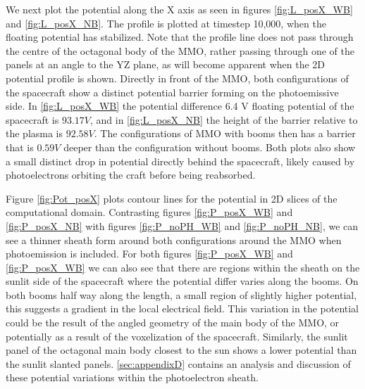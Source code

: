We next plot the potential along the X axis as seen in figures \ref{fig:L_posX_WB} and \ref{fig:L_posX_NB}. The profile is plotted at timestep 10,000, when the floating potential has stabilized. Note that the profile line does not pass through the centre of the octagonal body of the MMO, rather passing through one of the panels at an angle to the YZ plane, as will become apparent when the 2D potential profile is shown. Directly in front of the MMO, both configurations of the spacecraft show a distinct potential barrier forming on the photoemissive side. In \ref{fig:L_posX_WB} the potential difference 6.4 V floating potential of the spacecraft is $93.17 V$, and in \ref{fig:L_posX_NB} the height of the barrier relative to the plasma is $92.58 V$. The configurations of MMO with booms then has a barrier that is $0.59 V$ deeper than the configuration without booms. Both plots also show a small distinct drop in potential directly behind the spacecraft, likely caused by photoelectrons orbiting the craft before being reabsorbed.    

Figure \ref{fig:Pot_posX} plots contour lines for the potential in 2D slices of the computational domain. Contrasting figures \ref{fig:P_posX_WB} and \ref{fig:P_posX_NB} with figures \ref{fig:P_noPH_WB} and \ref{fig:P_noPH_NB}, we can see a thinner sheath form around both configurations around the MMO when photoemission is included. For both figures \ref{fig:P_posX_WB} and \ref{fig:P_posX_WB} we can also see that there are regions within the sheath on the sunlit side of the spacecraft where the potential differ varies along the booms. On both booms half way along the length, a small region of slightly higher potential, this suggests a gradient in the local electrical field. This variation in the potential could be the result of the angled geometry of the main body of the MMO, or potentially as a result of the voxelization of the spacecraft. Similarly, the sunlit panel of the octagonal main body closest to the sun shows a lower potential than the sunlit slanted panels. \cref{sec:appendixD} contains an analysis and discussion of these potential variations within the photoelectron sheath.


